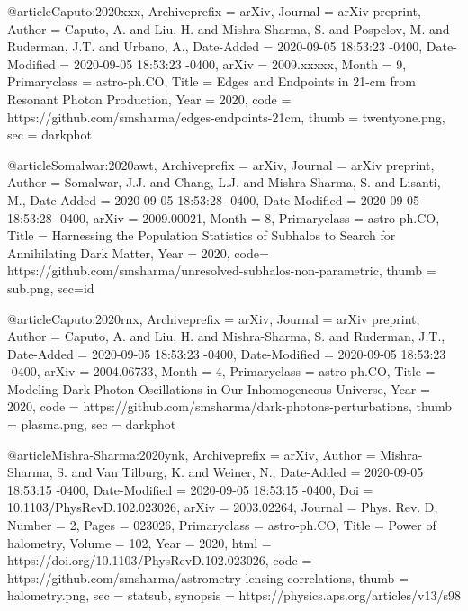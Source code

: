 



@article{Caputo:2020xxx,
	Archiveprefix = {arXiv},
	Journal = {arXiv preprint},
	Author = {Caputo, A. and Liu, H. and Mishra-Sharma, S. and Pospelov, M. and Ruderman, J.T. and Urbano, A.},
	Date-Added = {2020-09-05 18:53:23 -0400},
	Date-Modified = {2020-09-05 18:53:23 -0400},
	arXiv = {2009.xxxxx},
	Month = {9},
	Primaryclass = {astro-ph.CO},
	Title = {{Edges and Endpoints in 21-cm from Resonant Photon Production}},
	Year = {2020},
  	code = {https://github.com/smsharma/edges-endpoints-21cm},
	thumb = {twentyone.png},
	sec = {darkphot}}

@article{Somalwar:2020awt,
	Archiveprefix = {arXiv},
	Journal = {arXiv preprint},
	Author = {Somalwar, J.J. and Chang, L.J. and Mishra-Sharma, S. and Lisanti, M.},
	Date-Added = {2020-09-05 18:53:28 -0400},
	Date-Modified = {2020-09-05 18:53:28 -0400},
	arXiv = {2009.00021},
	Month = {8},
	Primaryclass = {astro-ph.CO},
	Title = {{Harnessing the Population Statistics of Subhalos to Search for Annihilating Dark Matter}},
	Year = {2020},
	code= {https://github.com/smsharma/unresolved-subhalos-non-parametric},
	thumb = {sub.png},
	sec={id}}

@article{Caputo:2020rnx,
	Archiveprefix = {arXiv},
	Journal = {arXiv preprint},
	Author = {Caputo, A. and Liu, H. and Mishra-Sharma, S. and Ruderman, J.T.},
	Date-Added = {2020-09-05 18:53:23 -0400},
	Date-Modified = {2020-09-05 18:53:23 -0400},
	arXiv = {2004.06733},
	Month = {4},
	Primaryclass = {astro-ph.CO},
	Title = {{Modeling Dark Photon Oscillations in Our Inhomogeneous Universe}},
	Year = {2020},
  	code = {https://github.com/smsharma/dark-photons-perturbations},
	thumb = {plasma.png},
	sec = {darkphot}}

@article{Mishra-Sharma:2020ynk,
	Archiveprefix = {arXiv},
	Author = {Mishra-Sharma, S. and Van Tilburg, K. and Weiner, N.},
	Date-Added = {2020-09-05 18:53:15 -0400},
	Date-Modified = {2020-09-05 18:53:15 -0400},
	Doi = {10.1103/PhysRevD.102.023026},
	arXiv = {2003.02264},
	Journal = {Phys. Rev. D},
	Number = {2},
	Pages = {023026},
	Primaryclass = {astro-ph.CO},
	Title = {{Power of halometry}},
	Volume = {102},
	Year = {2020},
	html = {https://doi.org/10.1103/PhysRevD.102.023026},
	code = {https://github.com/smsharma/astrometry-lensing-correlations},
	thumb = {halometry.png},
	sec = {statsub},
	synopsis = {https://physics.aps.org/articles/v13/s98}}

